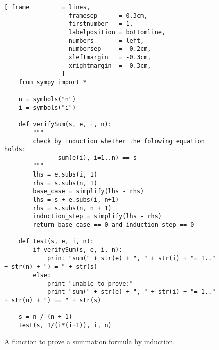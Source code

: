 \documentclass{article}
\begin{document}
\begin{figure}[!ht]
\centering 
\begin{Verbatim}[ frame         = lines, 
                  framesep      = 0.3cm, 
                  firstnumber   = 1,
                  labelposition = bottomline,
                  numbers       = left,
                  numbersep     = -0.2cm,
                  xleftmargin   = -0.3cm,
                  xrightmargin  = -0.3cm,
                ]
    from sympy import * 
    
    n = symbols("n") 
    i = symbols("i") 
    
    def verifySum(s, e, i, n):
        """
        check by induction whether the folowing equation holds:
               sum(e(i), i=1..n) == s 
        """
        lhs = e.subs(i, 1) 
        rhs = s.subs(n, 1) 
        base_case = simplify(lhs - rhs) 
        lhs = s + e.subs(i, n+1) 
        rhs = s.subs(n, n + 1) 
        induction_step = simplify(lhs - rhs) 
        return base_case == 0 and induction_step == 0 
    
    def test(s, e, i, n):
        if verifySum(s, e, i, n):
            print "sum(" + str(e) + ", " + str(i) + "= 1.." + str(n) + ") = " + str(s) 
        else:
            print "unable to prove:"
            print "sum(" + str(e) + ", " + str(i) + "= 1.." + str(n) + ") == " + str(s) 
            
    s = n / (n + 1) 
    test(s, 1/(i*(i+1)), i, n) 
\end{Verbatim}
\vspace*{-0.3cm}
\caption{A function to prove a summation formula by induction.}
\label{fig:induction.py}
\end{figure}
\end{document}

